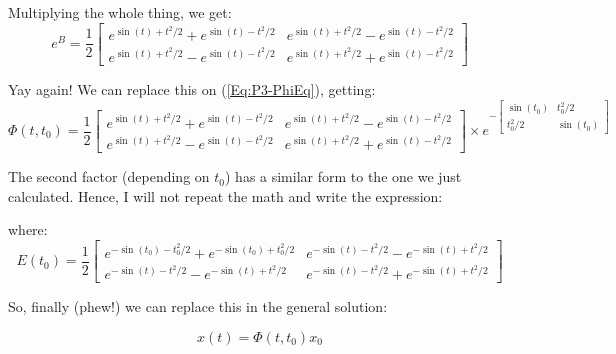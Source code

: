 \documentclass[10pt,a4paper]{article}
\begin{document}
Multiplying the whole thing, we get:
\[ e^{B} =
\dfrac{1}{2} 
\begin{bmatrix}
e^{\sin (t) + t^{2}/2} + e^{\sin (t) - t^{2}/2} & e^{\sin (t) + t^{2}/2} - e^{\sin (t) - t^{2}/2} \\
e^{\sin (t) + t^{2}/2} - e^{\sin (t) - t^{2}/2} & e^{\sin (t) + t^{2}/2} + e^{\sin (t) - t^{2}/2}
\end{bmatrix}
\]

Yay again! We can replace this on (\ref{Eq:P3-PhiEq}), getting:
\[
\Phi (t,t_{0}) = 
\dfrac{1}{2} 
\begin{bmatrix}
e^{\sin (t) + t^{2}/2} + e^{\sin (t) - t^{2}/2} & e^{\sin (t) + t^{2}/2} - e^{\sin (t) - t^{2}/2} \\
e^{\sin (t) + t^{2}/2} - e^{\sin (t) - t^{2}/2} & e^{\sin (t) + t^{2}/2} + e^{\sin (t) - t^{2}/2}
\end{bmatrix}
\times
e^{ -
\begin{bmatrix}
\sin (t_{0}) & t_{0}^{2}/2 \\
t_{0}^{2}/2 & \sin (t_{0})
\end{bmatrix} }
\]

The second factor (depending on $t_{0}$) has a similar form to the one we just calculated. Hence, I will not repeat the math and write the expression:
\medskip


where:
\[ E(t_{0}) =
\dfrac{1}{2} 
\begin{bmatrix}
e^{-\sin (t_{0}) - t_{0}^{2}/2} + e^{-\sin (t_{0}) + t_{0}^{2}/2} & e^{-\sin (t) - t^{2}/2} - e^{-\sin (t) + t^{2}/2} \\
e^{-\sin (t) - t^{2}/2} - e^{-\sin (t) + t^{2}/2} & e^{-\sin (t) - t^{2}/2} + e^{-\sin (t) + t^{2}/2}
\end{bmatrix}
\]

So, finally (phew!) we can replace this in the general solution:

\[x(t) = \Phi (t,t_{0}) x_{0} \]

\end{document}
